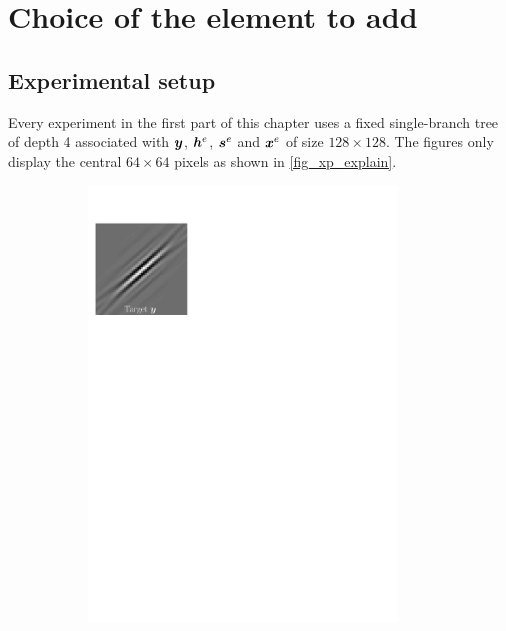 \section{Choice of the element to add}

\subsection{Experimental setup}
Every experiment in the first part of this chapter uses a fixed single-branch tree of depth 4 associated with $\bm{y}$, $\bm{h}^e$, $\bm{s}^e$ and $\bm{x}^e$ of size $128 \times 128$. The figures only display the central $64 \times 64$ pixels as shown in \cref{fig_xp_explain}.

\begin{figure}[!ht]\centering
\begin{subfigure}[b]{0.32\textwidth}\centering
	\includegraphics[width=0.9\textwidth]{figures/xp_explain/target.pdf}
	\caption{}
\end{subfigure}
\begin{subfigure}[b]{0.32\textwidth}\centering

\end{subfigure}
\end{figure}
